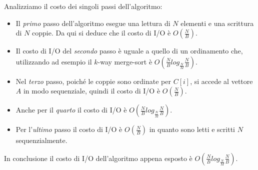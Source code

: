 Analizziamo il costo dei singoli passi dell'algoritmo:
\begin{itemize}
    \item Il \emph{primo} passo dell'algoritmo esegue una lettura di \(N\) elementi
    e una scrittura di \(N\) coppie. Da qui si deduce che il costo di I/O è
    \(O\left(\frac{N}{B}\right)\).
    \item Il costo di I/O del \emph{secondo} passo è uguale a quello di un
    ordinamento che, utilizzando ad esempio il \(k\)-way merge-sort è
    \(O\left(\frac{N}{B}log_\frac{N}{M} \frac{N}{B}\right)\).
    \item Nel \emph{terzo} passo, poiché le coppie sono ordinate per \(C[i]\), si accede
    al vettore \(A\) in modo sequenziale, quindi il costo di I/O è \(O\left(\frac{N}{B}\right)\).
    \item Anche per il \emph{quarto} il costo di I/O è
    \(O\left(\frac{N}{B}log_\frac{N}{M} \frac{N}{B}\right)\).
    \item Per l'\emph{ultimo} passo il costo di I/O è \(O\left(\frac{N}{B}\right)\) in quanto
    sono letti e scritti \(N\) sequenzialmente.
\end{itemize}

In conclusione il costo di I/O dell'algoritmo appena esposto è
\(O\left(\frac{N}{B}log_\frac{N}{M} \frac{N}{B}\right)\).